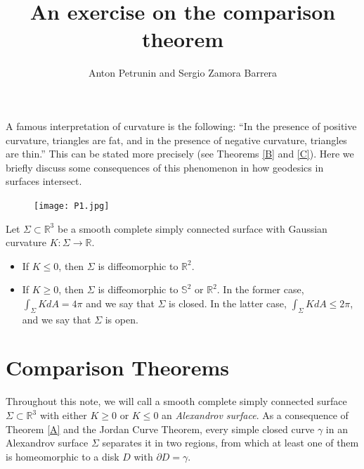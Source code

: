 \documentclass[oneside,a4paper]{amsart}
\begin{document}
\title{An exercise on the comparison theorem}
\author{Anton Petrunin and Sergio Zamora Barrera}

\maketitle


A famous interpretation of curvature is the following: ``In the presence of positive curvature, triangles are fat, and in the presence of negative curvature, triangles are thin.'' This can be stated more precisely (see Theorems \ref{B} and \ref{C}). Here we briefly discuss some consequences of this phenomenon in how geodesics in surfaces intersect.


\begin{figure}[h]
\begin{center}
\texttt{[image: P1.jpg]}\\
\end{center}
\end{figure}



\begin{thm}\label{A}
Let $\Sigma \subset \mathbb{R}^3$ be a smooth complete simply connected surface with Gaussian curvature $K : \Sigma \to \mathbb{R}$.
\begin{itemize}
\item If $K\leq 0$, then $\Sigma$ is diffeomorphic to $\mathbb{R}^2$.
\item If $K \geq 0$, then $\Sigma$ is diffeomorphic to $\mathbb{S}^2$ or $\mathbb{R}^2$. In the former case, $\int_{\Sigma} K dA = 4 \pi$ and we say that $\Sigma$ is closed. In the latter case, $\int_{\Sigma} K dA \leq 2 \pi$, and we say that $\Sigma$ is open.
\end{itemize}
\end{thm}

\section*{Comparison Theorems}

Throughout this note, we will call a smooth complete simply connected surface $\Sigma \subset \mathbb{R}^3$ with either $K \geq 0$ or $K \leq 0$ an \textit{Alexandrov surface}. As a consequence of Theorem \ref{A} and the Jordan Curve Theorem, every simple closed curve $\gamma$ in an Alexandrov surface $\Sigma$ separates it in two regions, from which at least one of them is homeomorphic to a disk $D$ with $\partial D = \gamma$.
\end{document}
